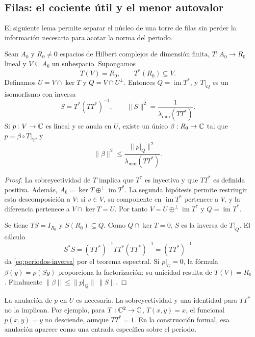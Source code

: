 \subsection{Filas: el cociente útil y el menor autovalor}

El siguiente lema permite separar el núcleo de una torre de filas sin
perder la información necesaria para acotar la norma del periodo.

\begin{lema}
Sean $A_0$ y $R_0\ne0$ espacios de Hilbert complejos de dimensión
finita, $T:A_0\to R_0$ lineal y $V\subseteq A_0$ un subespacio.
Supongamos
\[
 T(V)=R_0,\qquad T^*(R_0)\subseteq V.
\]
Definamos $U=V\cap\ker T$ y $Q=V\cap U^\perp$. Entonces
$Q=\operatorname{im}T^*$, y $T|_Q$ es un isomorfismo con inversa
\begin{equation}
 S=T^*(TT^*)^{-1},\qquad
 \|S\|^2=\frac1{\lambda_{\min}(TT^*)}.
 \label{eq:periodos-inversa}
\end{equation}
Si $p:V\to\mathbb{C}$ es lineal y se anula en $U$, existe un único
$\beta:R_0\to\mathbb{C}$ tal que $p=\beta\circ T|_V$, y
\begin{equation}
 \|\beta\|^2\le
       \frac{\|p|_Q\|^2}{\lambda_{\min}(TT^*)}.
 \label{eq:periodos-descenso-norma}
\end{equation}
\label{lem:periodos-cociente}
\end{lema}

\begin{proof}
La sobreyectividad de $T$ implica que $T^*$ es inyectiva y que
$TT^*$ es definida positiva. Además,
$A_0=\ker T\mathbin\oplus^\perp\operatorname{im}T^*$.
La segunda hipótesis permite restringir esta descomposición a $V$:
si $v\in V$, su componente en $\operatorname{im}T^*$ pertenece a
$V$, y la diferencia pertenece a $V\cap\ker T=U$.
Por tanto $V=U\mathbin\oplus^\perp\operatorname{im}T^*$ y
$Q=\operatorname{im}T^*$.

Se tiene $TS=I_{R_0}$ y $S(R_0)\subseteq Q$. Como
$Q\cap\ker T=0$, $S$ es la inversa de $T|_Q$. El cálculo
\[
 S^*S=(TT^*)^{-1}TT^*(TT^*)^{-1}=(TT^*)^{-1}
\]
da \eqref{eq:periodos-inversa} por el teorema espectral.
Si $p|_U=0$, la fórmula $\beta(y)=p(Sy)$ proporciona la
factorización; su unicidad resulta de $T(V)=R_0$.
Finalmente $\|\beta\|\le\|p|_Q\|\,\|S\|$.
\end{proof}

La anulación de $p$ en $U$ es necesaria. La sobreyectividad y una
identidad para $TT^*$ no la implican. Por ejemplo, para
$T:\mathbb{C}^2\to\mathbb{C}$, $T(x,y)=x$, el funcional $p(x,y)=y$ no desciende,
aunque $TT^*=1$. En la construcción formal, esa anulación aparece
como una entrada específica sobre el periodo.

